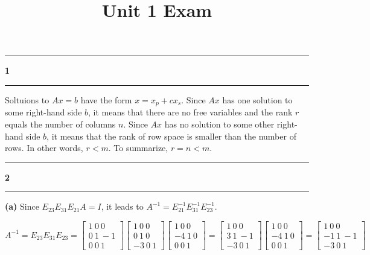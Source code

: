 \documentclass[11pt]{article}
\newcommand\question[2]{\vspace{.25in}\hrule\textbf{#1 #2}\vspace{.5em}\hrule\vspace{.10in}}
\renewcommand\part[1]{\vspace{.10in}\textbf{(#1)}}
\begin{document}
\raggedright
\newcommand\NAME{Haiying Cui}  %
\newcommand\ANDREWID{Christy}     %
\newcommand\HWNUM{13}              %

\title{Unit 1 Exam}
\maketitle

\question{1}{}
Soltuions to \(Ax = b\) have the form \(x = x_p + cx_s\). Since \(Ax\) has one solution to some right-hand side \(b\), it means that there are no free variables and the rank \(r\) equals the number of columns \(n\). Since \(Ax\) has no solution to some other right-hand side \(b\), it means that the rank of row space is smaller than the number of rows. In other words, \(r < m\). To summarize, \(r = n < m\).
\question{2}{}
\part{a} Since \(E_{23}E_{31}E_{21}A = I\), it leads to \(A^{-1} = E_{21}^{-1}E_{31}^{-1}E_{23}^{-1}\).

\(A^{-1} = E_{23}E_{31}E_{23} = \begin{bmatrix} 1 \ 0 \ 0 \\ 0 \ 1 \ -1 \\ 0 \ 0 \ 1 \end{bmatrix}\begin{bmatrix} 1 \ 0 \ 0 \\ 0 \ 1 \ 0 \\ -3 \ 0 \ 1 \end{bmatrix}\begin{bmatrix} 1 \ 0 \ 0 \\ -4 \ 1 \ 0 \\ 0 \ 0 \ 1 \end{bmatrix} = \begin{bmatrix} 1 \ 0 \ 0 \\ 3 \ 1 \ -1 \\ -3 \ 0 \ 1 \end{bmatrix}\begin{bmatrix} 1 \ 0 \ 0 \\ -4 \ 1 \ 0 \\ 0 \ 0 \ 1 \end{bmatrix} = \begin{bmatrix} 1 \ 0 \ 0 \\ -1 \ 1 \ -1 \\ -3 \ 0 \ 1 \end{bmatrix}\)
\end{document}
